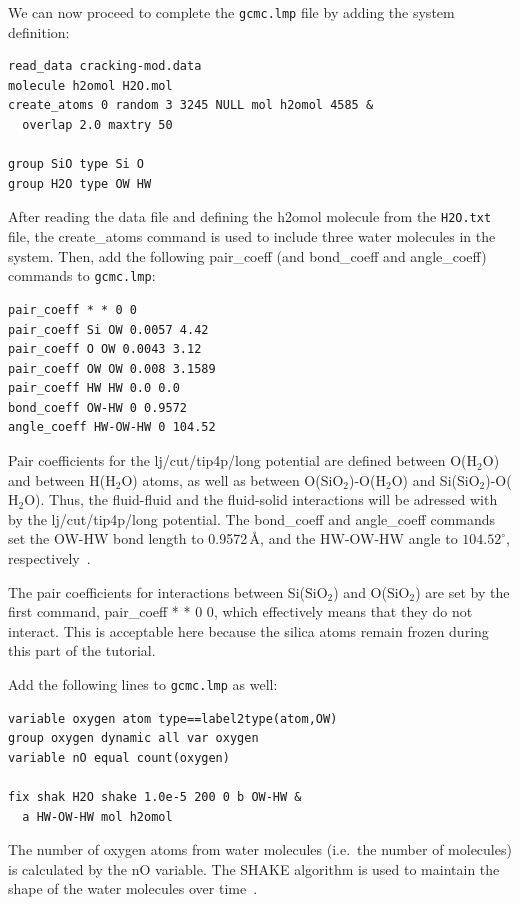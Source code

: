 \documentclass[9pt,tutorial]{livecoms}
\newcommand{\lmpcmd}[1]{\hspace{0pt}\colorbox{listing}{\textcolor{command}{\small{#1}}}\hspace{0pt}} %
\newcommand{\flecmd}[1]{\textcolor{command}{\texttt{#1}}} %
\begin{document}
We can now proceed to complete the \flecmd{gcmc.lmp} file by adding the system definition:
\begin{lstlisting}
read_data cracking-mod.data
molecule h2omol H2O.mol
create_atoms 0 random 3 3245 NULL mol h2omol 4585 &
  overlap 2.0 maxtry 50

group SiO type Si O
group H2O type OW HW
\end{lstlisting}
After reading the data file and defining the \lmpcmd{h2omol} molecule from the \flecmd{H2O.txt}
file, the \lmpcmd{create\_atoms} command is used to include three water molecules
in the system.  Then, add the following \lmpcmd{pair\_coeff} (and
\lmpcmd{bond\_coeff} and \lmpcmd{angle\_coeff}) commands
to \flecmd{gcmc.lmp}:
\begin{lstlisting}
pair_coeff * * 0 0
pair_coeff Si OW 0.0057 4.42
pair_coeff O OW 0.0043 3.12
pair_coeff OW OW 0.008 3.1589
pair_coeff HW HW 0.0 0.0
bond_coeff OW-HW 0 0.9572
angle_coeff HW-OW-HW 0 104.52
\end{lstlisting}
Pair coefficients for the \lmpcmd{lj/cut/tip4p/long}
potential are defined between O($\text{H}_2\text{O}$) and between H($\text{H}_2\text{O}$)
atoms, as well as between O($\text{SiO}_2$)-O($\text{H}_2\text{O}$) and
Si($\text{SiO}_2$)-O($\text{H}_2\text{O}$).  Thus, the fluid-fluid and the
fluid-solid interactions will be adressed with by the \lmpcmd{lj/cut/tip4p/long} potential.
The \lmpcmd{bond\_coeff} and \lmpcmd{angle\_coeff} commands set the \lmpcmd{OW-HW}
bond length to 0.9572\,\AA, and the \lmpcmd{HW-OW-HW}
angle to $104.52^\circ$, respectively~\cite{abascal2005general}.

\begin{note}
{\color{blue} The pair coefficients for interactions between Si($\text{SiO}_2$)
and O($\text{SiO}_2$) are set by the first command, \lmpcmd{pair\_coeff * * 0 0},
which effectively means that they do not interact. This is acceptable here because
the silica atoms remain frozen during this part of the tutorial.}
\end{note}

Add the following lines to \flecmd{gcmc.lmp} as well:
\begin{lstlisting}
variable oxygen atom type==label2type(atom,OW)
group oxygen dynamic all var oxygen
variable nO equal count(oxygen)

fix shak H2O shake 1.0e-5 200 0 b OW-HW &
  a HW-OW-HW mol h2omol
\end{lstlisting}
The number of oxygen atoms from water molecules (i.e.~the number of molecules)
is calculated by the \lmpcmd{nO} variable.  The SHAKE algorithm is used to
maintain the shape of the water molecules over time~\cite{ryckaert1977numerical, andersen1983rattle}.
\end{document}

